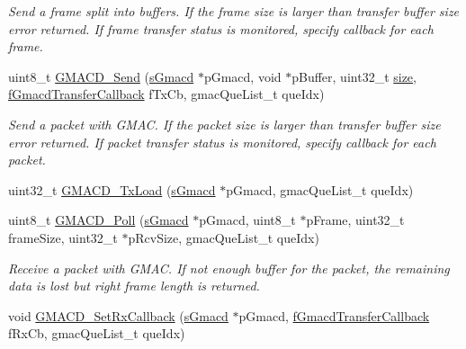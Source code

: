\begin{DoxyCompactItemize}
\begin{DoxyCompactList}\small\item\em Send a frame split into buffers. If the frame size is larger than transfer buffer size error returned. If frame transfer status is monitored, specify callback for each frame. \end{DoxyCompactList}\item 
uint8\+\_\+t \mbox{\hyperlink{group__gmacd__functions_ga2f3e029556b9627258a2eb1dc4919d95}{G\+M\+A\+C\+D\+\_\+\+Send}} (\mbox{\hyperlink{group__gmacd__types_gaa8760917079000a5ee7fbc7fab992dd3}{s\+Gmacd}} $\ast$p\+Gmacd, void $\ast$p\+Buffer, uint32\+\_\+t \mbox{\hyperlink{sun4u_2tte_8h_a245260f6f74972558f61b85227df5aae}{size}}, \mbox{\hyperlink{group__gmacd__types_ga64979042bf43f697de166e864e3259de}{f\+Gmacd\+Transfer\+Callback}} f\+Tx\+Cb, gmac\+Que\+List\+\_\+t que\+Idx)
\begin{DoxyCompactList}\small\item\em Send a packet with G\+M\+AC. If the packet size is larger than transfer buffer size error returned. If packet transfer status is monitored, specify callback for each packet. \end{DoxyCompactList}\item 
uint32\+\_\+t \mbox{\hyperlink{group__gmacd__functions_ga1bd3fe40e63537dce59dd4368dce4253}{G\+M\+A\+C\+D\+\_\+\+Tx\+Load}} (\mbox{\hyperlink{group__gmacd__types_gaa8760917079000a5ee7fbc7fab992dd3}{s\+Gmacd}} $\ast$p\+Gmacd, gmac\+Que\+List\+\_\+t que\+Idx)
\item 
uint8\+\_\+t \mbox{\hyperlink{group__gmacd__functions_gaa45b1118c5a1147bde4e3026194bc965}{G\+M\+A\+C\+D\+\_\+\+Poll}} (\mbox{\hyperlink{group__gmacd__types_gaa8760917079000a5ee7fbc7fab992dd3}{s\+Gmacd}} $\ast$p\+Gmacd, uint8\+\_\+t $\ast$p\+Frame, uint32\+\_\+t frame\+Size, uint32\+\_\+t $\ast$p\+Rcv\+Size, gmac\+Que\+List\+\_\+t que\+Idx)
\begin{DoxyCompactList}\small\item\em Receive a packet with G\+M\+AC. If not enough buffer for the packet, the remaining data is lost but right frame length is returned. \end{DoxyCompactList}\item 
void \mbox{\hyperlink{group__gmacd__functions_ga3ea0884def476f9698f1cdbae6b6f3e2}{G\+M\+A\+C\+D\+\_\+\+Set\+Rx\+Callback}} (\mbox{\hyperlink{group__gmacd__types_gaa8760917079000a5ee7fbc7fab992dd3}{s\+Gmacd}} $\ast$p\+Gmacd, \mbox{\hyperlink{group__gmacd__types_ga64979042bf43f697de166e864e3259de}{f\+Gmacd\+Transfer\+Callback}} f\+Rx\+Cb, gmac\+Que\+List\+\_\+t que\+Idx)

\end{DoxyCompactItemize}
